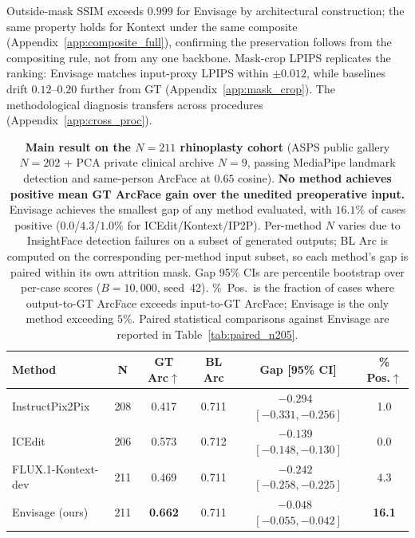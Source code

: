 \documentclass{article}
\newcommand{\method}{Envisage}
\newcommand{\best}[1]{\textbf{#1}}
\begin{document}
Outside-mask SSIM exceeds $0.999$ for \method{} by architectural
construction; the same property holds for Kontext under the same composite
(Appendix~\ref{app:composite_full}), confirming the preservation follows
from the compositing rule, not from any one backbone. Mask-crop LPIPS
replicates the ranking: \method{} matches input-proxy LPIPS within
$\pm 0.012$, while baselines drift $0.12$--$0.20$ further from GT
(Appendix~\ref{app:mask_crop}). The methodological diagnosis transfers
across procedures (Appendix~\ref{app:cross_proc}).

\begin{table}[t]
\centering
\small
\caption{\textbf{Main result on the $N{=}211$ rhinoplasty cohort}
(ASPS public gallery $N{=}202$ + PCA private clinical archive $N{=}9$,
passing MediaPipe landmark detection and same-person ArcFace at $0.65$
cosine). \textbf{No method achieves positive mean GT ArcFace gain over the
unedited preoperative input.} \method{} achieves the smallest gap of any
method evaluated, with $16.1\%$ of cases positive ($0.0$/$4.3$/$1.0\%$ for
ICEdit/Kontext/IP2P). Per-method $N$ varies
due to InsightFace detection failures on a subset of generated outputs;
BL Arc is computed on the corresponding per-method input subset, so each
method's gap is paired within its own attrition mask. Gap 95\% CIs are
percentile bootstrap over per-case scores ($B{=}10{,}000$, seed~42).
\%~Pos.\ is the fraction of cases where output-to-GT ArcFace exceeds
input-to-GT ArcFace; \method{} is the only method exceeding $5\%$.
Paired statistical comparisons against \method{} are reported in
Table~\ref{tab:paired_n205}.}
\label{tab:strict_n211}
\begin{tabular}{@{}lccccc@{}}
\toprule
\textbf{Method} & \textbf{N} & \textbf{GT Arc}$\uparrow$ & \textbf{BL Arc} & \textbf{Gap [95\% CI]} & \textbf{\% Pos.}$\uparrow$ \\
\midrule
InstructPix2Pix     & 208 & 0.417 & 0.711 & $-0.294$~$[-0.331, -0.256]$ & 1.0 \\
ICEdit              & 206 & 0.573 & 0.712 & $-0.139$~$[-0.148, -0.130]$ & 0.0 \\
FLUX.1-Kontext-dev  & 211 & 0.469 & 0.711 & $-0.242$~$[-0.258, -0.225]$ & 4.3 \\
\method{} (ours)    & 211 & \best{0.662} & 0.711 & \best{$-0.048$~$[-0.055, -0.042]$} & \best{16.1} \\
\bottomrule
\end{tabular}
\end{table}
\end{document}
